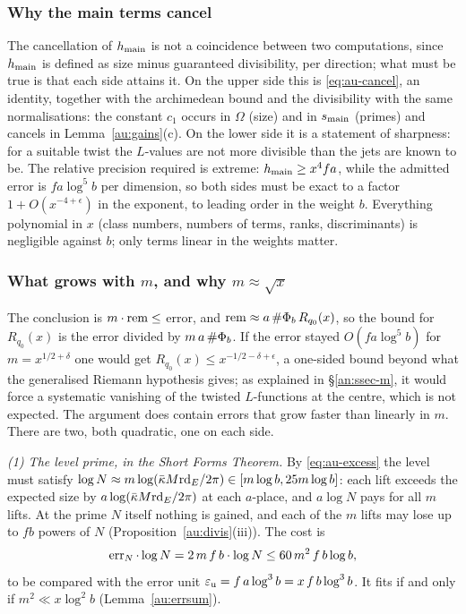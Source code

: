 \documentclass[10pt]{amsart}
\theoremstyle{definition}
\theoremstyle{remark}
\begin{document}
\subsubsection*{Why the main terms cancel}
The cancellation of $h_{\mathrm{main}}$ is not a coincidence between two computations, since $h_{\mathrm{main}}$ is
defined as size minus guaranteed divisibility, per direction; what must be true is that each side
attains it. On the upper side this is \eqref{eq:au-cancel}, an identity, together with the
archimedean bound and the divisibility with the same normalisations: the constant $c_1$ occurs in
$\Omega$ (size) and in $s_{\mathrm{main}}$ (primes) and cancels in Lemma~\ref{au:gains}(c). On the lower
side it is a statement of sharpness: for a suitable twist the $L$-values are not more divisible
than the jets are known to be. The relative precision required is extreme: $h_{\mathrm{main}}\ge x^4fa$,
while the admitted error is $fa\log^5b$ per dimension, so both sides must be exact to a factor
$1+O(x^{-4+\epsilon})$ in the exponent, to leading order in the weight $b$. Everything
polynomial in $x$ (class numbers, numbers of terms, ranks, discriminants) is negligible against
$b$; only terms linear in the weights matter.

\subsubsection*{What grows with $m$, and why $m\approx\sqrt x$}
The conclusion is $m\cdot\operatorname{rem}\le$ error, and $\operatorname{rem}\approx a\,\#\Phi_b\,R_{q_0}(x)$, so the bound
for $R_{q_0}(x)$ is the error divided by $m\,a\,\#\Phi_b$. If the error stayed $O(fa\log^5b)$ for
$m=x^{1/2+\delta}$ one would get $R_{q_0}(x)\le x^{-1/2-\delta+\epsilon}$, a one-sided bound
beyond what the generalised Riemann hypothesis gives; as explained in \S\ref{an:ssec-m}, it would
force a systematic vanishing of the twisted $L$-functions at the centre, which is not expected. The
argument does contain errors that grow faster than linearly in $m$. There are two, both quadratic, one on each side.

\emph{(1) The level prime, in the Short Forms Theorem.} By \eqref{eq:au-excess} the level must satisfy
$\log N\approx m\log(\bar\kappa M\mathrm{rd}_E/2\pi)\in[m\log b,25m\log b]$: each lift exceeds the expected
size by $a\log(\bar\kappa M\mathrm{rd}_E/2\pi)$ at each $a$-place, and $a\log N$ pays for all $m$ lifts.
At the prime $N$ itself nothing is gained, and each of the $m$ lifts may lose up to $fb$ powers of
$N$ (Proposition~\ref{au:divis}(iii)). The cost is
\[
\operatorname{err}_N\cdot\log N=2\,m\,f\,b\cdot\log N\le60\,m^2\,f\,b\log b ,
\]
to be compared with the error unit $\varepsilon_{\mathrm u}=f\,a\log^3b=x\,f\,b\log^3b$. It fits if and only if
$m^2\ll x\log^2b$ (Lemma~\ref{au:errsum}).
\end{document}
